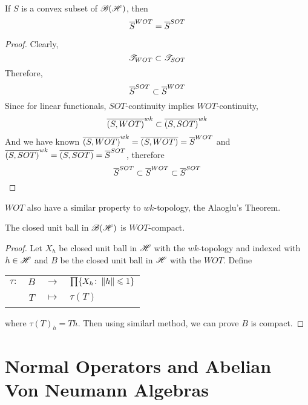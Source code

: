 \documentclass[a4paper,11pt]{report}
\begin{document}
\begin{prop}
	If $S$ is a convex subset of $\mathscr{B(H)}$, then
	\begin{equation*}
		\overline{S}^{WOT} = \overline{S}^{SOT} 
	\end{equation*}
\end{prop}
\begin{proof}
	Clearly, 
	\begin{equation*}
		\mathscr{T}_{WOT} \subset \mathscr{T}_{SOT}
	\end{equation*}
	Therefore,
	\begin{equation*}
		\overline{S}^{SOT} \subset \overline{S}^{WOT}
	\end{equation*}
	Since for linear functionals, $SOT$-continuity implies $WOT$-continuity, 
	\begin{equation*}
		\overline{(S,WOT)}^{wk} \subset \overline{(S,SOT)}^{wk}
	\end{equation*}
	And we have known $\overline{(S,WOT)}^{wk} = \overline{(S,WOT)} = \overline{S}^{WOT}$ and $\overline{(S,SOT)}^{wk} = \overline{(S,SOT)} = \overline{S}^{SOT}$, therefore
	\begin{equation*}
		\overline{S}^{SOT} \subset \overline{S}^{WOT} \subset \overline{S}^{SOT} \qedhere
	\end{equation*}
\end{proof}

$WOT$ also have a similar property to $wk$-topology, the Alaoglu's Theorem.
\begin{thm}
	The closed unit ball in $\mathscr{B(H)}$ is $WOT$-compact.
\end{thm}
\begin{proof}
	Let $X_h$ be closed unit ball in $\mathscr{H}$ with the $wk$-topology and indexed with $h \in \mathscr{H}$ and $B$ be the closed unit ball in $\mathscr{H}$ with the $WOT$. Define
	\begin{center}
		\begin{tabular}{l c c l}
			$\tau \colon$ & $B$ & $\longrightarrow$ & $\prod\{X_h \colon \left\lVert h\right\lVert \leqslant 1\}$ \\
			~ & $T$ & $\longmapsto$ & $\tau(T)$
		\end{tabular}
	\end{center}
	where $\tau(T)_h = Th$. Then using similarl method, we can prove $B$ is compact.
\end{proof}


\chapter{Normal Operators and Abelian Von Neumann Algebras}
\end{document}
